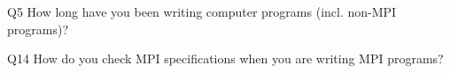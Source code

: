\begin{description}%
\item{Q5} How long have you been writing computer programs (incl. non-MPI programs)?%
\item{Q14} How do you check MPI specifications when you are writing MPI programs?%
\end{description}%
